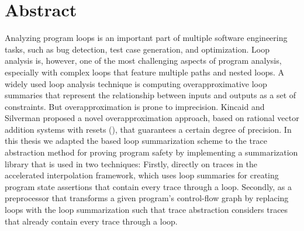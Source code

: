 \section*{Abstract}
Analyzing program loops is an important part of multiple software engineering tasks, such as bug detection, test case generation, and optimization. Loop analysis is, however, one of the most challenging aspects of program analysis, especially with complex loops that feature multiple paths and nested loops. A widely used loop analysis technique is computing overapproximative loop summaries that represent the relationship between inputs and outputs as a set of constraints. But overapproximation is prone to imprecision. Kincaid and Silverman proposed a novel overapproximation approach, based on rational vector addition systems with resets (\qvasr), that guarantees a certain degree of precision. In this thesis we adapted the \qvasr based loop summarization scheme to the trace abstraction method for proving program safety by implementing a summarization library that is used in two techniques: Firstly, directly on traces in the accelerated interpolation framework, which uses loop summaries for creating program state assertions that contain every trace through a loop. Secondly, as a preprocessor that transforms a given program's control-flow graph by replacing loops with the loop summarization such that trace abstraction considers traces that already contain every trace through a loop.
\pagebreak